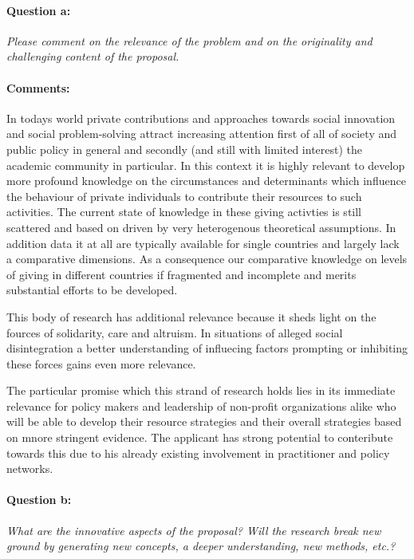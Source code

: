 \documentclass[twocolumn, serif, rga, numeric]{jote-article}
\begin{document}
\paragraph{Question a:}
\textit{Please comment on the relevance of the problem and on the originality and challenging content of the proposal.}
\paragraph{Comments:}
In todays world private contributions and approaches towards social innovation and social problem-solving attract increasing attention first of all of society and public policy in general and secondly (and still with limited interest) the academic community in particular. In this context it is highly relevant to develop more profound knowledge on the circumstances and determinants which influence the behaviour of private individuals to contribute their resources to such activities. The current state of knowledge in these giving activties is still scattered and based on driven by very heterogenous theoretical assumptions. In addition data it at all are typically available for single countries and largely lack a comparative dimensions. As a consequence our comparative knowledge on levels of giving in different countries if fragmented and incomplete and merits substantial efforts to be developed.

This body of research has additional relevance because it sheds light on the fources of solidarity, care and altruism. In situations of alleged social disintegration a better understanding of influecing factors prompting or inhibiting these forces gains even more relevance.

The particular promise which this strand of research holds lies in its immediate relevance for policy makers and leadership of non-profit organizations alike who will be able to develop their resource strategies and their overall strategies based on mnore stringent evidence. The applicant has strong potential to conteribute towards this due to his already existing involvement in practitioner and policy networks.
\paragraph{Question b:}
\textit{What are the innovative aspects of the proposal? Will the research break new ground by generating new concepts, a deeper understanding, new methods, etc.?}
\end{document}
